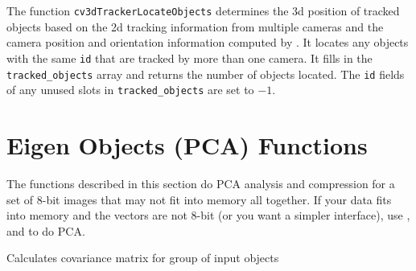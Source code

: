 The function \texttt{cv3dTrackerLocateObjects} determines the 3d position of tracked objects based on the 2d tracking information from multiple cameras and the camera position and orientation information computed by . It locates any objects with the same \texttt{id} that are tracked by more than one camera. It fills in the \texttt{tracked\_objects} array and returns the number of objects located. The \texttt{id} fields of any unused slots in \texttt{tracked\_objects} are set to $-1$.

\section{Eigen Objects (PCA) Functions}

The functions described in this section do PCA analysis
and compression for a set of 8-bit images that may not fit
into memory all together. If your data fits into memory and
the vectors are not 8-bit (or you want a simpler interface), use
,
and
to do PCA.


Calculates covariance matrix for group of input objects


\begin{description}
\end{description}

